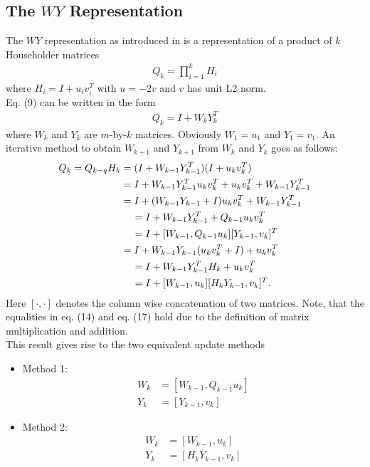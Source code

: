 \documentclass{article}
\begin{document}
\subsection{The $WY$ Representation}\label{sec_wy}
The $WY$ representation as introduced in \cite{WY} is a representation of a product of $k$ Householder matrices
\begin{align}
	Q_k = \prod_{i=1}^kH_i
\end{align}
where $H_i=I + u_iv_i^T$ with $u=-2v$ and $v$ has unit L2 norm.\\
Eq. (9) can be written in the form 
\begin{align}
Q_k = I + W_kY_k^T
\end{align}
where $W_k$ and $Y_k$ are $m$-by-$k$ matrices. Obviously $W_1=u_1$ and $Y_1=v_1$. An iterative method to obtain $W_{k+1}$ and $Y_{k+1}$ from $W_k$ and $Y_k$ goes as follows:\\
\begin{align}
	Q_k = Q_{k-q}H_k &= (I + W_{k-1}Y_{k-1}^T)(I + u_kv_k^T) \\
	&= I + W_{k-1}Y_{k-1}^Tu_kv_k^T +u_kv_k^T + W_{k-1}Y_{k-1}^T\\
	&= I + (W_{k-1}Y_{k-1} + I)u_kv_k^T + W_{k-1}Y_{k-1}^T \\
	&\text{\hspace{4mm}} = I + W_{k-1}Y_{k-1}^T + Q_{k-1}u_kv_k^T \\
	&\text{\hspace{4mm}} = I + [W_{k-1}, Q_{k-1}u_k][Y_{k-1}, v_k]^T \\
	&= I + W_{k-1}Y_{k-1}(u_kv_k^T + I) + u_kv_k^T \\
	&\text{\hspace{4mm}} = I + W_{k-1}Y_{k-1}^T H_k + u_kv_k^T \\
	&\text{\hspace{4mm}} = I + [W_{k-1}, u_k][H_kY_{k-1}, v_k]^T .
\end{align}
Here $[\cdot, \cdot]$ denotes the column wise concatenation of two matrices. Note, that the equalities in eq. (14) and eq. (17) hold due to the definition of matrix multiplication and addition. \\
This result gives rise to the two equivalent update methods
\begin{itemize}
	\item Method 1:\\
		\begin{align}
			W_k &= [W_{k-1}, Q_{k-1}u_k]\\
			Y_k &= [Y_{k-1}, v_k]
		\end{align}
	\item Method 2:\\
		\begin{align}
			W_k &= [W_{k-1}, u_k]\\
			Y_k &= [H_kY_{k-1}, v_k]
		\end{align}
	\end{itemize}
\end{document}
